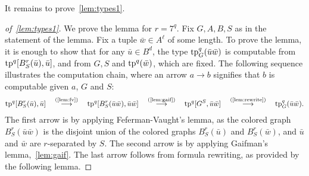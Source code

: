 It remains to prove~\cref{lem:types1}.




\begin{proof}[of~\cref{lem:types1}]
We prove the lemma for $r=7^q$. 
Fix $G,A,B,S$  as in the statement of the lemma.
Fix a tuple $\bar w\in A^\ell$ of some length.
To prove the lemma, it is enough to show that
for any   $\bar u\in B^d$,
the type
$\mathrm{tp}^q_G(\bar u\bar w)$ is computable from $\mathrm{tp}^q[B^r_S(\bar u), \bar u]$,
and from 
$G,S$ and $\mathrm{tp}^q(\bar w)$, which are fixed.
The following sequence illustrates the computation chain,
where an arrow $a\rightarrow b$ signifies that $b$ is computable given $a$, $G$ and $S$:
\begin{align*}
	\mathrm{tp}^q[B^r_S(\bar u), \bar u]
  \quad\stackrel{\textrm{(\ref{lem:fv})}}{\longrightarrow}\quad
	\mathrm{tp}^q[B^r_S(\bar u\bar w), \bar u\bar w] \quad\stackrel{\textrm{(\ref{lem:gaif})}}\longrightarrow\quad
	\mathrm{tp}^q[G^S, \bar u\bar w] \quad\stackrel{\textrm{(\ref{lem:rewrite})}}\longrightarrow\quad
	\mathrm{tp}^q_G(\bar u\bar w).
\end{align*}
The first arrow is by applying Feferman-Vaught's lemma,
as the colored graph $B^r_S(\bar u\bar w)$
is the disjoint union of the colored graphs 
$B^r_S(\bar u)$ and $B^r_S(\bar w)$,
and $\bar u$ and $\bar w$ are $r$-separated by $S$.
The second arrow is by applying Gaifman's lemma,~\cref{lem:gaif}.
The last arrow follows from formula rewriting, as provided by the following lemma.


\end{proof}

